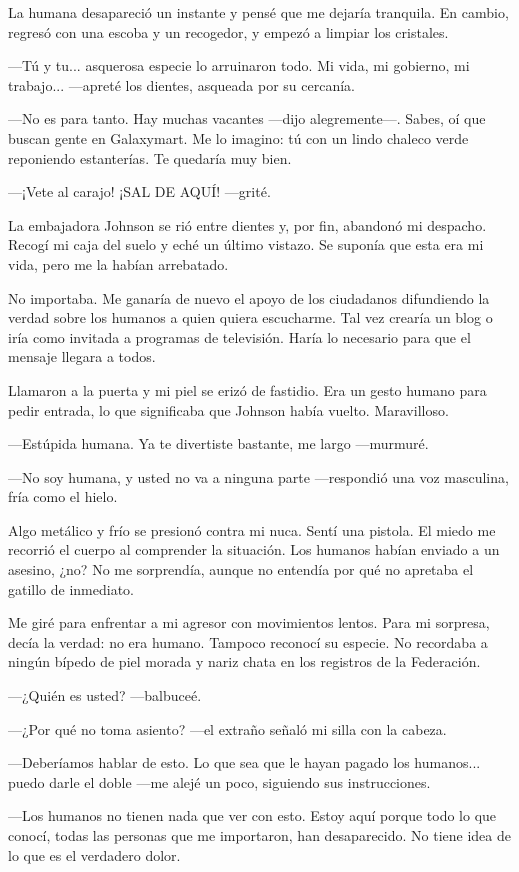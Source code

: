 La humana desapareció un instante y pensé que me dejaría tranquila. En cambio, regresó con una escoba y un recogedor, y empezó a limpiar los cristales.

—Tú y tu... asquerosa especie lo arruinaron todo. Mi vida, mi gobierno, mi trabajo... —apreté los dientes, asqueada por su cercanía.

—No es para tanto. Hay muchas vacantes —dijo alegremente—. Sabes, oí que buscan gente en Galaxymart. Me lo imagino: tú con un lindo chaleco verde reponiendo estanterías. Te quedaría muy bien.

—¡Vete al carajo! ¡SAL DE AQUÍ! —grité.

La embajadora Johnson se rió entre dientes y, por fin, abandonó mi despacho. Recogí mi caja del suelo y eché un último vistazo. Se suponía que esta era mi vida, pero me la habían arrebatado.

No importaba. Me ganaría de nuevo el apoyo de los ciudadanos difundiendo la verdad sobre los humanos a quien quiera escucharme. Tal vez crearía un blog o iría como invitada a programas de televisión. Haría lo necesario para que el mensaje llegara a todos.

Llamaron a la puerta y mi piel se erizó de fastidio. Era un gesto humano para pedir entrada, lo que significaba que Johnson había vuelto. Maravilloso.

—Estúpida humana. Ya te divertiste bastante, me largo —murmuré.

—No soy humana, y usted no va a ninguna parte —respondió una voz masculina, fría como el hielo.

Algo metálico y frío se presionó contra mi nuca. Sentí una pistola. El miedo me recorrió el cuerpo al comprender la situación. Los humanos habían enviado a un asesino, ¿no? No me sorprendía, aunque no entendía por qué no apretaba el gatillo de inmediato.

Me giré para enfrentar a mi agresor con movimientos lentos. Para mi sorpresa, decía la verdad: no era humano. Tampoco reconocí su especie. No recordaba a ningún bípedo de piel morada y nariz chata en los registros de la Federación.

 —¿Quién es usted? —balbuceé.

—¿Por qué no toma asiento? —el extraño señaló mi silla con la cabeza.

—Deberíamos hablar de esto. Lo que sea que le hayan pagado los humanos... puedo darle el doble —me alejé un poco, siguiendo sus instrucciones.

—Los humanos no tienen nada que ver con esto. Estoy aquí porque todo lo que conocí, todas las personas que me importaron, han desaparecido. No tiene idea de lo que es el verdadero dolor.

